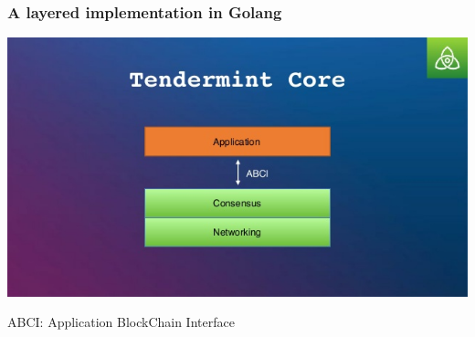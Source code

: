 \documentclass[11pt]{beamer}  %
\begin{document}
\begin{frame}\frametitle{A layered implementation in Golang}

  \begin{center}
    \includegraphics[scale=.45,clip=false]{pictures/tendermint-core.jpg}
  \end{center}

  \begin{center}
    ABCI: Application BlockChain Interface
  \end{center}

\end{frame}
\end{document}
